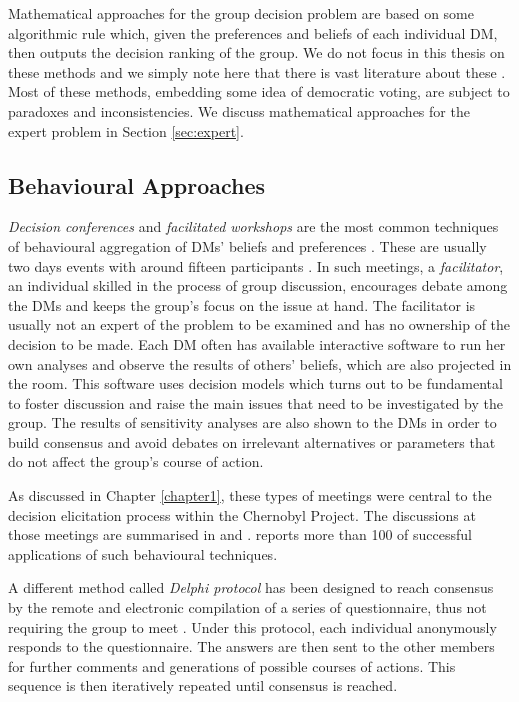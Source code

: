 Mathematical approaches for the group decision problem are based on some algorithmic rule which, given the preferences and beliefs of each individual DM, then outputs the decision ranking of the group. We do not focus in this thesis on these methods and we simply note here that there is vast literature about these \citep[see e.g.][]{Arrow1963,Keeney1976, Keeney1993a, French2009,French2011,Keeney2013}. Most of these methods, embedding some idea of democratic voting, are subject to paradoxes and inconsistencies. We discuss mathematical approaches for the expert problem in Section \ref{sec:expert}.
 
\subsection{Behavioural Approaches}
\label{sec:decconf}

\textit{Decision conferences} and \textit{facilitated workshops} are the most common techniques of behavioural aggregation of DMs' beliefs and preferences \citep{ Ackermann1996,Phillips1984,Phillips1993}. These are usually two days events with around fifteen participants \citep[although for example in the Chernobyl project we discussed in Chapter \ref{chapter1} the number of participants was way larger, as noted in][]{French2009}. In such meetings, a \textit{facilitator}, an individual skilled in the process of group discussion, encourages debate among the DMs and keeps the group's focus on the issue at hand. The facilitator is usually not an expert of the problem to be examined and has no ownership of the decision to be made. Each DM often has available interactive software to run her own analyses and observe the results of others' beliefs, which are also projected in the room. This software uses decision models which turns out to be fundamental to foster discussion and raise the main issues that need to be investigated by the group. The results of sensitivity analyses are also shown to the DMs in order to build consensus and avoid debates on irrelevant alternatives or parameters that do not affect the group's course of action. 

As discussed in Chapter \ref{chapter1}, these types of meetings were central to the decision elicitation process within the Chernobyl Project. The discussions at those meetings are summarised in \citet{French2009} and \citet{Smith2010}. \citet{Ackermann1996} reports more than 100 of successful applications of such behavioural techniques. 

A different method called \textit{Delphi protocol} has been designed to reach consensus by the remote and electronic compilation of a series of questionnaire, thus not requiring the group to meet \citep{Dalkey1963,Linstone1975}. Under this protocol, each individual anonymously responds to the questionnaire. The answers are then sent to the other members for further comments and generations of possible courses of actions. This sequence is then iteratively repeated until consensus is reached. 
 
